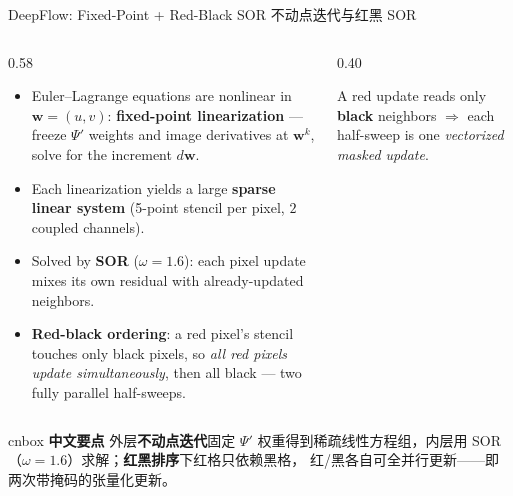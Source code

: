 \documentclass[aspectratio=169,10pt]{beamer}
\newcommand{\zh}[1]{{\zhfont #1}}
\newenvironment{cn}{%
  \begin{beamercolorbox}[rounded=true,sep=4pt,wd=\textwidth]{cnbox}\zhfont\footnotesize
  {\color{cblue!70!black}\textbf{中文要点}}\quad}%
  {\end{beamercolorbox}}
\begin{document}
\begin{frame}{DeepFlow: Fixed-Point + Red-Black SOR \zh{不动点迭代与红黑 SOR}}
  \begin{columns}[T]
    \begin{column}{0.58\textwidth}
      \begin{itemize}\itemsep1pt
        \item Euler--Lagrange equations are nonlinear in
          $\mathbf{w}=(u,v)$: \textbf{fixed-point linearization} --- freeze
          $\Psi'$ weights and image derivatives at $\mathbf{w}^k$, solve for
          the increment $d\mathbf{w}$.
        \item Each linearization yields a large \textbf{sparse linear system}
          (5-point stencil per pixel, $2$ coupled channels).
        \item Solved by \textbf{SOR} ($\omega=1.6$): each pixel update mixes its
          own residual with already-updated neighbors.
        \item \textbf{Red-black ordering}: a red pixel's stencil touches only
          black pixels, so \emph{all red pixels update simultaneously}, then
          all black --- two fully parallel half-sweeps.
      \end{itemize}
    \end{column}
    \begin{column}{0.40\textwidth}
      \centering
      \par{\scriptsize A \textcolor{cred!85}{red} update reads only
        \textbf{black} neighbors $\Rightarrow$ each half-sweep is one
        \emph{vectorized masked update}.}
    \end{column}
  \end{columns}
  \vfill
  \begin{cn}
    外层\textbf{不动点迭代}固定 $\Psi'$ 权重得到稀疏线性方程组，内层用
    SOR（$\omega=1.6$）求解；\textbf{红黑排序}下红格只依赖黑格，
    红/黑各自可全并行更新——即两次带掩码的张量化更新。
  \end{cn}
\end{frame}
\end{document}
